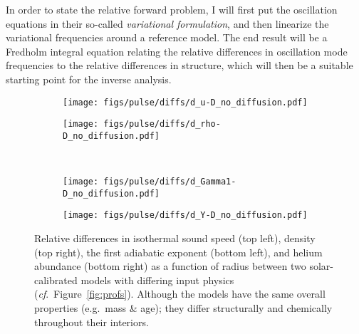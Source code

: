 In order to state the relative forward problem, I will first put the oscillation equations in their so-called \emph{variational formulation}, and then %
linearize the variational frequencies around a reference model. 
The end result will be a Fredholm integral equation relating the relative differences in oscillation mode frequencies to the relative differences in structure, which will then be a suitable starting point for the inverse analysis. 


\begin{figure}
    \centering
    \begin{subfigure}[b]{0.5\linewidth}
        \centering
        \texttt{[image: figs/pulse/diffs/d\_u-D\_no\_diffusion.pdf]}
    \end{subfigure}%
    \begin{subfigure}[b]{0.5\linewidth}
        \centering
        \texttt{[image: figs/pulse/diffs/d\_rho-D\_no\_diffusion.pdf]}%
    \end{subfigure}\\
    \begin{subfigure}[b]{0.5\linewidth}
        \centering
        \texttt{[image: figs/pulse/diffs/d\_Gamma1-D\_no\_diffusion.pdf]}%
    \end{subfigure}%
    \begin{subfigure}[b]{0.5\linewidth}
        \centering
        \texttt{[image: figs/pulse/diffs/d\_Y-D\_no\_diffusion.pdf]}%
    \end{subfigure}
    \caption[Structural differences between two solar models]{Relative differences in isothermal sound speed (top left), density (top right), the first adiabatic exponent (bottom left), and helium abundance (bottom right) as a function of radius between two solar-calibrated models with differing input physics (\emph{cf}.~Figure~\ref{fig:profs}). 
    Although the models have the same overall properties (e.g.\ mass \& age); they differ structurally and chemically throughout their interiors. %
    } 
    \label{fig:prof_diffs} 
\end{figure}





